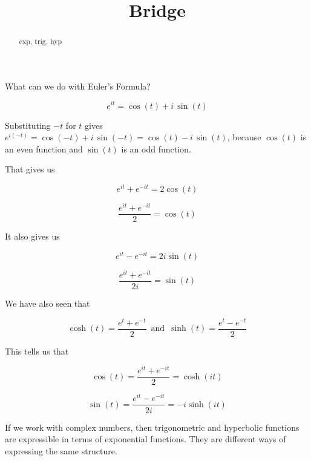 \documentclass{ximera}
\title{Bridge}
\begin{document}
\begin{abstract}
exp, trig, hyp
\end{abstract}
\maketitle





What can we do with Euler's Formula?



\[ e^{i t} = \cos(t) + i \, \sin(t) \]

Substituting $-t$ for $t$ gives $e^{i (-t)} = \cos(-t) + i \, \sin(-t) = \cos(t) - i \, \sin(t)$, because $\cos(t)$ is an even function and $\sin(t)$ is an odd function.



That gives us 

\[   e^{i t}  + e^{-i t} = 2 \cos(t)    \]


\[   \frac{e^{i t}  + e^{-i t}}{2} = \cos(t)    \]


It also gives us 



\[   e^{i t}  - e^{-i t} = 2 i \sin(t)    \]


\[   \frac{e^{i t}  + e^{-i t}}{2 i} = \sin(t)    \]





We have also seen that 


\[  \cosh(t)  = \frac{e^t + e^{-t}}{2}      \,   \text{ and } \,  \sinh(t)  = \frac{e^t - e^{-t}}{2}     \]



This tells us that 

\[  \cos(t) =  \frac{e^{i t} + e^{-i t}}{2} = \cosh(i t)      \]




\[  \sin(t) =  \frac{e^{i t} - e^{-i t}}{2 i} = -i \sinh(i t)      \]






If we work with complex numbers, then trigonometric and hyperbolic functions are expressible in terms of exponential functions.  They are different ways of expressing the same structure.
\end{document}
